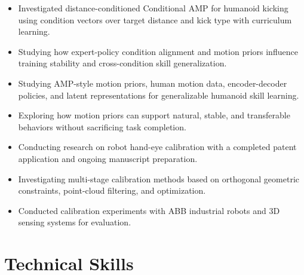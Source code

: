 \documentclass[10pt]{article}
\begin{document}
\begin{itemize}
  \item Investigated distance-conditioned Conditional AMP for humanoid kicking using condition vectors over target distance and kick type with curriculum learning.
  \item Studying how expert-policy condition alignment and motion priors influence training stability and cross-condition skill generalization.
\end{itemize}

\begin{itemize}
  \item Studying AMP-style motion priors, human motion data, encoder-decoder policies, and latent representations for generalizable humanoid skill learning.
  \item Exploring how motion priors can support natural, stable, and transferable behaviors without sacrificing task completion.
\end{itemize}

\begin{itemize}
  \item Conducting research on robot hand-eye calibration with a completed patent application and ongoing manuscript preparation.
  \item Investigating multi-stage calibration methods based on orthogonal geometric constraints, point-cloud filtering, and optimization.
  \item Conducted calibration experiments with ABB industrial robots and 3D sensing systems for evaluation.
\end{itemize}

\section{Technical Skills}\color{black}
\end{document}
